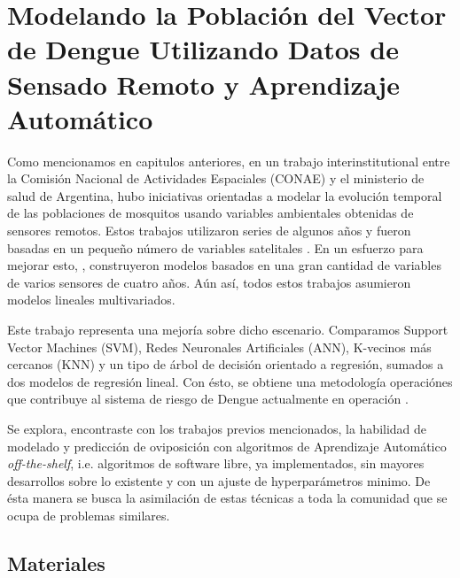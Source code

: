 


\justifying
\chapter{Modelando la Población del Vector de Dengue Utilizando Datos de Sensado Remoto y Aprendizaje Automático}

  \par Como mencionamos en capitulos anteriores, en un trabajo interinstitutional entre
    la Comisión Nacional de Actividades Espaciales (CONAE) y el ministerio de salud
    de Argentina, hubo iniciativas orientadas a modelar la evolución temporal de
    las poblaciones de mosquitos usando variables ambientales obtenidas de
    sensores remotos. Estos trabajos utilizaron series de algunos años y fueron
    basadas en un pequeño número de variables satelitales \cite{ndwi_erffectiveness, modis_data}.
    En un esfuerzo para mejorar esto, \cite{temporal_modeling}, construyeron modelos
    basados en una gran cantidad de variables de varios sensores de cuatro años.
    Aún así, todos estos trabajos asumieron modelos lineales multivariados.

  \par Este trabajo representa una mejoría sobre dicho escenario. Comparamos
    Support Vector Machines (SVM), Redes Neuronales Artificiales (ANN),
    K-vecinos más cercanos (KNN) y un tipo de árbol de decisión orientado a
    regresión, sumados a dos modelos de regresión lineal. Con ésto, se
    obtiene una metodología operaciónes que contribuye al sistema de riesgo
    de Dengue actualmente en operación \cite{porcasi_operative, analisis_cordoba}.

  \par Se explora, encontraste con los trabajos previos mencionados, la habilidad
    de modelado y predicción de oviposición con algoritmos de Aprendizaje
    Automático \textit{off-the-shelf}, i.e. algoritmos de software libre, ya
    implementados, sin mayores desarrollos sobre lo existente y con un ajuste de
    hyperparámetros minimo. De ésta manera se busca la asimilación de estas
    técnicas a toda la comunidad que se ocupa de problemas similares.


\section{Materiales}

